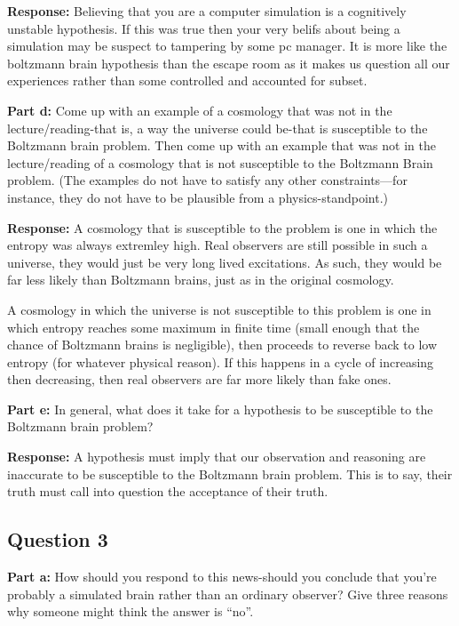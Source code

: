\documentclass{article}
\begin{document}
\noindent\textbf{Response:} Believing that you are a computer simulation is a cognitively unstable hypothesis. If this was true then your very belifs about being a simulation may be suspect to tampering by some pc manager. It is more like the boltzmann brain hypothesis than the escape room as it makes us question all our experiences rather than some controlled and accounted for subset.
\bigskip

\noindent\textbf{Part d:} Come up with an example of a cosmology that was not in the lecture/reading-that is, a way the universe could be-that is susceptible to the Boltzmann brain problem. Then come up with an example that was not in the lecture/reading of a cosmology that is not susceptible to the Boltzmann Brain problem.  (The examples do not have to satisfy any other constraints—for instance, they do not have to be plausible from a physics-standpoint.)
\bigskip

\noindent\textbf{Response:} A cosmology that is susceptible to the problem is one in which the entropy was always extremley high. Real observers are still possible in such a universe, they would just be very long lived excitations. As such, they would be far less likely than Boltzmann brains, just as in the original cosmology.

A cosmology in which the universe is not susceptible to this problem is one in which entropy reaches some maximum in finite time (small enough that the chance of Boltzmann brains is negligible), then proceeds to reverse back to low entropy (for whatever physical reason). If this happens in a cycle of increasing then decreasing, then real observers are far more likely than fake ones.
\bigskip

\noindent\textbf{Part e:} In general, what does it take for a hypothesis to be susceptible to the Boltzmann brain problem?
\bigskip

\noindent\textbf{Response:} A hypothesis must imply that our observation and reasoning are inaccurate to be susceptible to the Boltzmann brain problem. This is to say, their truth must call into question the acceptance of their truth.
\bigskip

\subsection*{Question 3}
\noindent\textbf{Part a:} How should you respond to this news-should you conclude that you’re probably a simulated brain rather than an ordinary observer? Give three reasons why someone might think the answer is ``no''.
\bigskip
\end{document}
